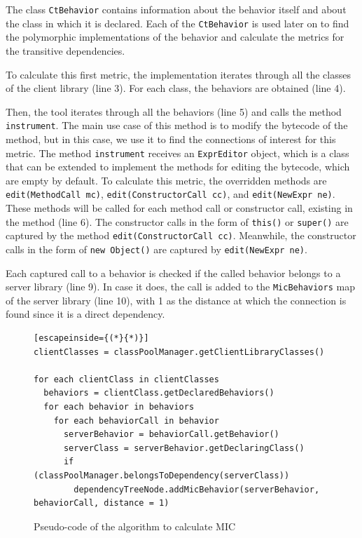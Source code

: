 The class \texttt{CtBehavior} contains information about the behavior itself and about the class in which it is declared. Each of the \texttt{CtBehavior} is used later on to find the polymorphic implementations of the behavior and calculate the metrics for the transitive dependencies.

To calculate this first metric, the implementation iterates through all the classes of the client library (line 3). For each class, the behaviors are obtained (line 4).

Then, the tool iterates through all the behaviors (line 5) and calls the method \texttt{instrument}. The main use case of this method is to modify the bytecode of the method, but in this case, we use it to find the connections of interest for this metric. The method \texttt{instrument} receives an \texttt{ExprEditor} object, which is a class that can be extended to implement the methods for editing the bytecode, which are empty by default. To calculate this metric, the overridden methods are \texttt{edit(MethodCall mc)}, \texttt{edit(ConstructorCall cc)}, and \texttt{edit(NewExpr ne)}. These methods will be called for each method call or constructor call, existing in the method (line 6). The constructor calls in the form of \texttt{this()} or \texttt{super()} are captured by the method \texttt{edit(ConstructorCall cc)}. Meanwhile, the constructor calls in the form of \texttt{new Object()} are captured by \texttt{edit(NewExpr ne)}.

Each captured call to a behavior is checked if the called behavior belongs to a server library (line 9). In case it does, the call is added to the \texttt{MicBehaviors} map of the server library (line 10), with 1 as the distance at which the connection is found since it is a direct dependency.

\begin{figure}[ht!]
\begin{lstlisting}[escapeinside={(*}{*)}]
clientClasses = classPoolManager.getClientLibraryClasses()

for each clientClass in clientClasses
  behaviors = clientClass.getDeclaredBehaviors()
  for each behavior in behaviors
    for each behaviorCall in behavior
      serverBehavior = behaviorCall.getBehavior()
      serverClass = serverBehavior.getDeclaringClass()
      if (classPoolManager.belongsToDependency(serverClass))
        dependencyTreeNode.addMicBehavior(serverBehavior, behaviorCall, distance = 1)
\end{lstlisting}
\caption{Pseudo-code of the algorithm to calculate MIC}
\label{fig:algorithm-mic}
\end{figure}

